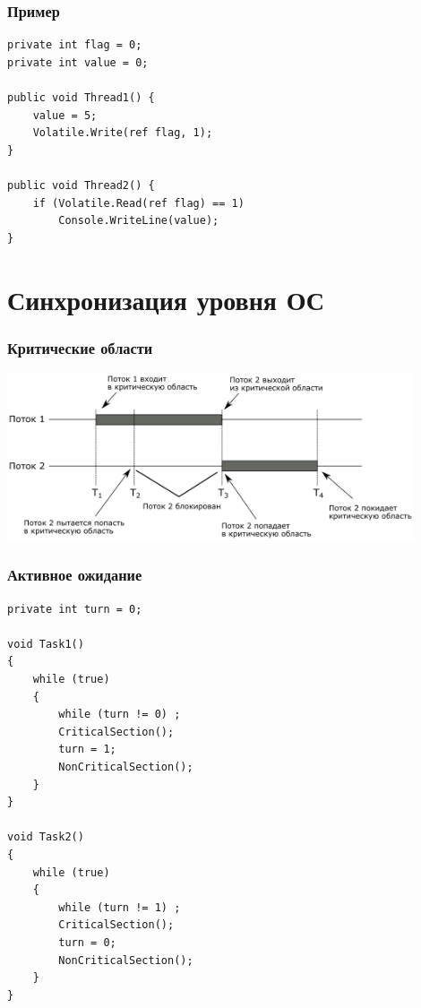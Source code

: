 \documentclass[xetex,mathserif,serif]{beamer}
\begin{document}
	\begin{frame}[fragile]
		\frametitle{Пример}
		\begin{verbatim}
private int flag = 0;
private int value = 0;

public void Thread1() {
    value = 5;
    Volatile.Write(ref flag, 1);
}

public void Thread2() {
    if (Volatile.Read(ref flag) == 1)
        Console.WriteLine(value);
}
		\end{verbatim}
	\end{frame}

	\section{Синхронизация уровня ОС}

	\begin{frame}
		\frametitle{Критические области}
		\begin{center}
			\includegraphics[width=0.9\textwidth]{criticalSections.png}
		\end{center}
	\end{frame}

	\begin{frame}[fragile]
		\frametitle{Активное ожидание}
		\begin{scriptsize}
			\begin{verbatim}
private int turn = 0;

void Task1()
{
    while (true)
    {
        while (turn != 0) ;
        CriticalSection();
        turn = 1;
        NonCriticalSection();
    }
}

void Task2()
{
    while (true)
    {
        while (turn != 1) ;
        CriticalSection();
        turn = 0;
        NonCriticalSection();
    }
}
			\end{verbatim}
		\end{scriptsize}
	\end{frame}
\end{document}
